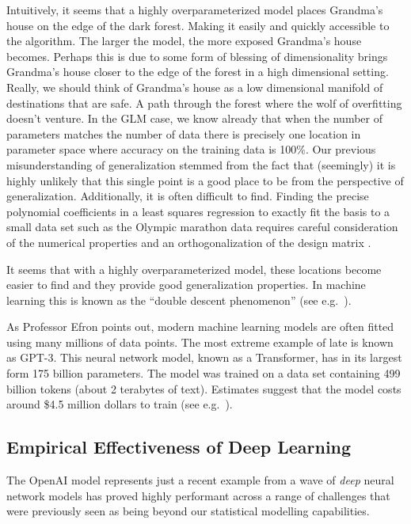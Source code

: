 \documentclass[a4paperpaper,]{article}
\begin{document}
Intuitively, it seems that a highly overparameterized model places
Grandma's house on the edge of the dark forest. Making it easily and
quickly accessible to the algorithm. The larger the model, the more
exposed Grandma's house becomes. Perhaps this is due to some form of
blessing of dimensionality brings Grandma's house closer to the edge of
the forest in a high dimensional setting. Really, we should think of
Grandma's house as a low dimensional manifold of destinations that are
safe. A path through the forest where the wolf of overfitting doesn't
venture. In the GLM case, we know already that when the number of
parameters matches the number of data there is precisely one location in
parameter space where accuracy on the training data is 100\%. Our
previous misunderstanding of generalization stemmed from the fact that
(seemingly) it is highly unlikely that this single point is a good place
to be from the perspective of generalization. Additionally, it is often
difficult to find. Finding the precise polynomial coefficients in a
least squares regression to exactly fit the basis to a small data set
such as the Olympic marathon data requires careful consideration of the
numerical properties and an orthogonalization of the design matrix
\citep{Lawson:least95}.

It seems that with a highly overparameterized model, these locations
become easier to find and they provide good generalization properties.
In machine learning this is known as the ``double descent phenomenon''
(see e.g.~\citet{Belkin:reconciling19}).

As Professor Efron points out, modern machine learning models are often
fitted using many millions of data points. The most extreme example of
late is known as GPT-3. This neural network model, known as a
Transformer, has in its largest form 175 billion parameters. The model
was trained on a data set containing 499 billion tokens (about 2
terabytes of text). Estimates suggest that the model costs around \$4.5
million dollars to train (see e.g.~\citet{Li:openai20}).

\hypertarget{empirical-effectiveness-of-deep-learning}{%
\subsection{Empirical Effectiveness of Deep
Learning}\label{empirical-effectiveness-of-deep-learning}}


The OpenAI model represents just a recent example from a wave of
\emph{deep} neural network models has proved highly performant across a
range of challenges that were previously seen as being beyond our
statistical modelling capabilities.
\end{document}
